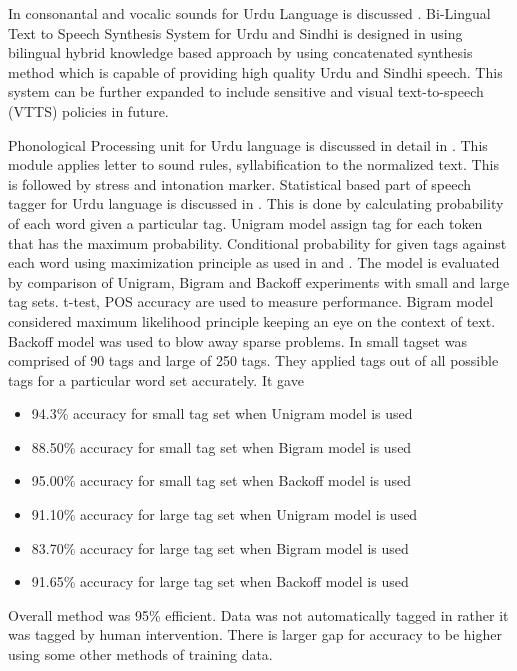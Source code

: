 In \cite{saleem2002urdu} consonantal and vocalic sounds for Urdu Language is discussed . Bi-Lingual Text to Speech Synthesis 
System for Urdu and Sindhi is designed in \cite{shah2004bi} using
bilingual hybrid knowledge based approach by using concatenated synthesis method which is capable of providing high quality 
Urdu and Sindhi speech. This system can be further expanded to include sensitive and visual text-to-speech (VTTS) policies in future.

Phonological Processing unit for Urdu language is discussed in detail in \cite{hussain2005phonological}. This module applies
letter to sound rules, syllabification to the normalized text. This is followed by stress and intonation
marker. Statistical based part of speech tagger for
Urdu language is discussed in \cite{anwar2007statistical}. This is done by calculating probability of each word given a particular tag. Unigram model assign tag for each token that has the maximum probability. Conditional probability for given tags against each word using maximization principle as used in \cite{bird2007introduction} and \cite{carlberger1999implementing}. The model is evaluated by comparison of Unigram, Bigram and Backoff experiments with small and large tag sets. t-test, POS accuracy are used to measure performance. Bigram model considered maximum likelihood principle keeping an
eye on the context of text. Backoff model was used to blow away sparse problems. In \cite{anwar2007statistical} small tagset was
comprised of 90 tags and large of 250 tags. They applied tags out of all possible tags for a particular word set accurately. It
gave

\begin{itemize}
	\item 94.3\% accuracy for small tag set when Unigram model is used
	\item 88.50\% accuracy for small tag set when Bigram model is used
	\item 95.00\% accuracy for small tag set when Backoff model is used
	\item 91.10\% accuracy for large tag set when Unigram model is used
	\item 83.70\% accuracy for large tag set when Bigram model is used
	\item 91.65\% accuracy for large tag set when Backoff model is used
\end{itemize}

Overall method was 95\% efficient. Data was not automatically tagged in \cite{anwar2007statistical} rather it was tagged by human
intervention. There is larger gap for accuracy to be higher using some other methods of training data.

